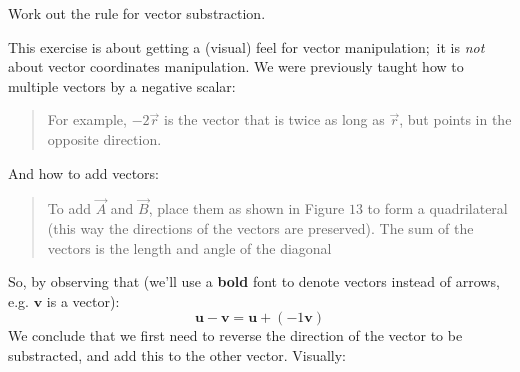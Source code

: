 \documentclass[solutions.tex]{subfiles}
\begin{document}
\maketitle
\begin{exercise} Work out the rule for vector substraction.
\end{exercise}
This exercise is about getting a (visual) feel for vector
manipulation; it is \textit{not} about vector coordinates manipulation.
We were previously taught how to multiple vectors by a negative
scalar:
\begin{quote}
For example, $-2\vec{r}$ is the vector that is twice as long
as $\vec{r}$, but points in the opposite direction.
\end{quote}
And how to add vectors:
\begin{quote}
To add $\vec{A}$ and $\vec{B}$, place them as shown in Figure $13$
to form a quadrilateral (this way the directions of the vectors are
preserved). The sum of the vectors is the length and angle of the
diagonal
\end{quote}
So, by observing that (we'll use a \textbf{bold} font to denote
vectors instead of arrows, e.g. $\bm{v}$ is a vector):
\[
	\bm{u}-\bm{v} = \bm{u} + (-1\bm{v})
\]
We conclude that we first need to reverse the direction of the
vector to be substracted, and add this to the other vector.
Visually:
\begin{figure}[H]
	\centering
\end{figure}
\end{document}
